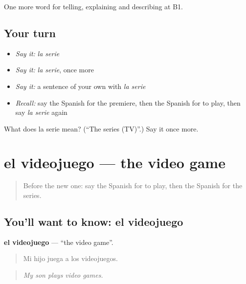 \begin{grammarlens}[title={What you've built}]
One more word for telling, explaining and describing at B1.
\end{grammarlens}

\subsection*{Your turn}
\begin{itemize}
\raggedright
  \item \emph{Say it:} \emph{la serie}
  \item \emph{Say it:} \emph{la serie}, once more
  \item \emph{Say it:} a sentence of your own with \emph{la serie}
  \item \emph{Recall:} say the Spanish for the premiere, then the Spanish for to play, then say \emph{la serie} again
\end{itemize}

\begin{tcolorbox}[breakable,colback=teal!4,colframe=teal!35!black,title={Before you move on}]
What does la serie mean? (\textquotedblleft{}The series (TV)\textquotedblright{}.) Say it once more.
\end{tcolorbox}
\section[el videojuego]{el videojuego — the video game}

\label{lesson:ES-C761-videojuego}



\begin{quote}
Before the new one: say the Spanish for to play, then the Spanish for the series.
\end{quote}

\subsection*{You'll want to know: el videojuego}
\textbf{el videojuego} — \textquotedblleft{}the video game\textquotedblright{}.

\begin{quote}
Mi hijo juega a los videojuegos.
\end{quote}

\begin{quote}
\emph{My son plays video games.}
\end{quote}

